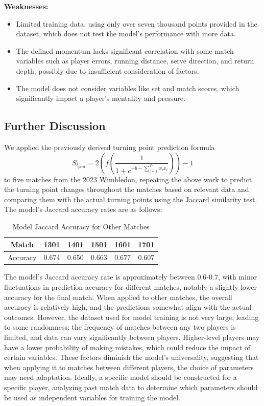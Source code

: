 \documentclass[UTF8]{ctexart} %
\begin{document}
\noindent\textbf{Weaknesses:}
\begin{itemize}
    \item Limited training data, using only over seven thousand points provided in the dataset, which 
    does not test the model's performance with more data.
    \item The defined momentum lacks significant correlation with some match variables such as player 
    errors, running distance, serve direction, and return depth, possibly due to insufficient 
    consideration of factors.
    \item The model does not consider variables like set and match scores, which significantly impact 
    a player's mentality and pressure.
\end{itemize}

\subsection{\textbf{Further Discussion}}
We applied the previously derived turning point prediction formula
\[S_{t_{pred}} = 2\left(f\left(\frac{1}{1 + e^{-b - \sum_{i=1}^{17}w_ix_i}}\right)\right) - 1\]
to five matches from the 2023 Wimbledon, repeating the above work to predict the turning point changes 
throughout the matches based on relevant data and comparing them with the actual turning points using 
the Jaccard similarity test. The model's Jaccard accuracy rates are as follows:

\begin{table}[H]
    \caption{Model Jaccard Accuracy for Other Matches}
    \centering
    \begin{tabular}{|c|c|c|c|c|c|}
    \hline
    Match & 1301 & 1401 & 1501 & 1601 & 1701 \\ \hline
    Accuracy & 0.674 & 0.650 & 0.663 & 0.677 & 0.607 \\ \hline
    \end{tabular}
\end{table}

The model's Jaccard accuracy rate is approximately between 0.6-0.7, with minor fluctuations in prediction 
accuracy for different matches, notably a slightly lower accuracy for the final match. When applied to 
other matches, the overall accuracy is relatively high, and the predictions somewhat align with the actual 
outcomes. However, the dataset used for model training is not very large, leading to some randomness: the 
frequency of matches between any two players is limited, and data can vary significantly between players. 
Higher-level players may have a lower probability of making mistakes, which could reduce the impact of 
certain variables. These factors diminish the model's universality, suggesting that when applying it to 
matches between different players, the choice of parameters may need adaptation. Ideally, a specific model 
should be constructed for a specific player, analyzing past match data to determine which parameters 
should be used as independent variables for training the model.
\end{document}
